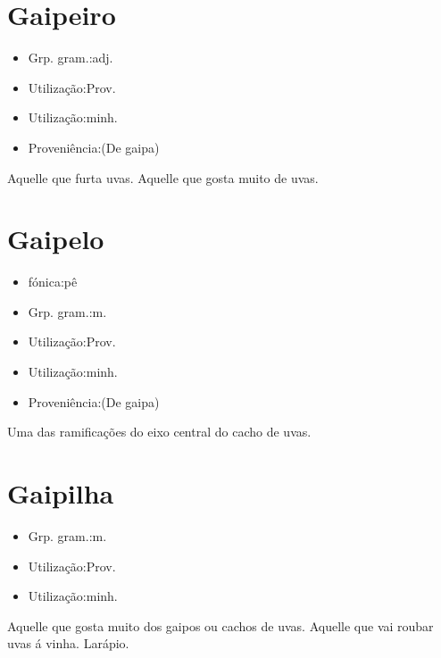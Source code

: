 \section{Gaipeiro}
\begin{itemize}
\item {Grp. gram.:adj.}
\end{itemize}
\begin{itemize}
\item {Utilização:Prov.}
\end{itemize}
\begin{itemize}
\item {Utilização:minh.}
\end{itemize}
\begin{itemize}
\item {Proveniência:(De \textunderscore gaipa\textunderscore )}
\end{itemize}
Aquelle que furta uvas.
Aquelle que gosta muito de uvas.
\section{Gaipelo}
\begin{itemize}
\item {fónica:pê}
\end{itemize}
\begin{itemize}
\item {Grp. gram.:m.}
\end{itemize}
\begin{itemize}
\item {Utilização:Prov.}
\end{itemize}
\begin{itemize}
\item {Utilização:minh.}
\end{itemize}
\begin{itemize}
\item {Proveniência:(De \textunderscore gaipa\textunderscore )}
\end{itemize}
Uma das ramificações do eixo central do cacho de uvas.
\section{Gaipilha}
\begin{itemize}
\item {Grp. gram.:m.}
\end{itemize}
\begin{itemize}
\item {Utilização:Prov.}
\end{itemize}
\begin{itemize}
\item {Utilização:minh.}
\end{itemize}
Aquelle que gosta muito dos gaipos ou cachos de uvas.
Aquelle que vai roubar uvas á vinha.
Larápio.
